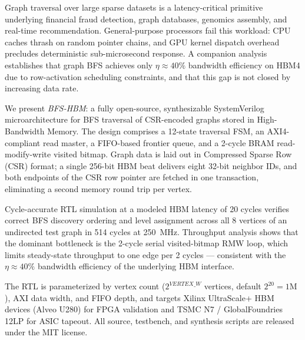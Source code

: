 Graph traversal over large sparse datasets is a latency-critical primitive underlying
financial fraud detection, graph databases, genomics assembly, and real-time recommendation.
General-purpose processors fail this workload: CPU caches thrash on random pointer chains,
and GPU kernel dispatch overhead precludes deterministic sub-microsecond response.
A companion analysis~\cite{fritz2026rmwwall} establishes that graph BFS achieves only
$\eta \approx 40\%$ bandwidth efficiency on HBM4 due to row-activation scheduling
constraints, and that this gap is not closed by increasing data rate.

We present \textit{BFS-HBM}: a fully open-source, synthesizable SystemVerilog
microarchitecture for BFS traversal of CSR-encoded graphs stored in High-Bandwidth Memory.
The design comprises a 12-state traversal FSM, an AXI4-compliant read master, a
FIFO-based frontier queue, and a 2-cycle BRAM read-modify-write visited bitmap.
Graph data is laid out in Compressed Sparse Row (CSR) format; a single 256-bit
HBM beat delivers eight 32-bit neighbor IDs, and both endpoints of the CSR row pointer
are fetched in one transaction, eliminating a second memory round trip per vertex.

Cycle-accurate RTL simulation at a modeled HBM latency of 20 cycles verifies
correct BFS discovery ordering and level assignment across all 8 vertices of an
undirected test graph in 514 cycles at 250~MHz. Throughput analysis shows that
the dominant bottleneck is the 2-cycle serial visited-bitmap RMW loop, which
limits steady-state throughput to one edge per 2 cycles — consistent with the
$\eta \approx 40\%$ bandwidth efficiency of the underlying HBM interface.

The RTL is parameterized by vertex count ($2^{\mathit{VERTEX\_W}}$ vertices, default
$2^{20} = 1\text{M}$), AXI data width, and FIFO depth, and targets Xilinx UltraScale+
HBM devices (Alveo U280) for FPGA validation and TSMC N7 / GlobalFoundries 12LP for
ASIC tapeout. All source, testbench, and synthesis scripts are released under the
MIT license.

